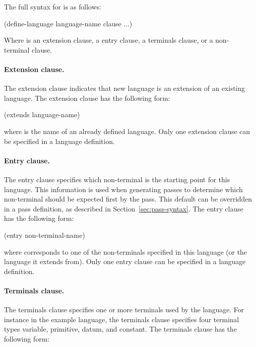 \documentclass[letterpaper,10pt]{article}
\begin{document}
The full syntax for  is as follows:

\begin{schemedisplay}
(define-language language-name clause ...)
\end{schemedisplay}

Where  is an extension clause, a entry clause, a terminals clause, or a non-terminal clause.

\paragraph{Extension clause.}
The extension clause indicates that new language is an extension of an existing
language.
The extension clause has the following form:

\begin{schemedisplay}
(extends language-name)
\end{schemedisplay}

where  is the name of an already defined language.
Only one extension clause can be specified in a language definition. 

\paragraph{Entry clause.}
The entry clause specifies which non-terminal is the starting point for this
language.
This information is used when generating passes to determine which non-terminal
should be expected first by the pass.
This default can be overridden in a pass definition, as described in
Section~\ref{sec:pass-syntax}.
The entry clause has the following form:

\begin{schemedisplay}
(entry non-terminal-name)
\end{schemedisplay}

where  corresponds to one of the non-terminals specified
in this language (or the language it extends from).
Only one entry clause can be specified in a language definition.

\paragraph{Terminals clause.}
The terminals clause specifies one or more terminals used by the language.
For instance in the  example language, the terminals clause
specifies four terminal types variable, primitive, datum, and constant.
The terminals clause has the following form:
\end{document}

